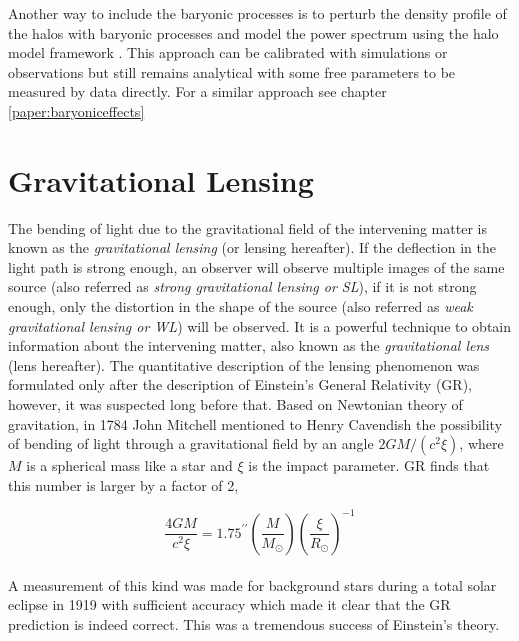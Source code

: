 Another way to include the baryonic processes is to perturb the density profile 
of the halos with baryonic processes and model the power spectrum using the halo model framework 
\cite{2014arXiv1410.6826M}.  This approach can 
be calibrated with simulations or observations but still remains analytical with some 
free parameters to be measured by data directly. 
For a similar approach see chapter \ref{paper:baryoniceffects}



\clearpage
\section{Gravitational Lensing}
The bending of light due to the gravitational field of the intervening matter is known as
the {\it gravitational lensing} (or lensing hereafter). If the deflection in the light
path is strong enough, an observer will observe multiple images of the same source 
(also referred as {\it strong gravitational lensing or SL}), 
if it is not strong enough, only the distortion in the shape of the source  
(also referred as {\it weak gravitational lensing or WL}) will be observed. It is a powerful technique to 
obtain information about the intervening matter, also known as the {\it gravitational
lens} (lens hereafter). The quantitative description of the lensing phenomenon
was formulated only after the description of Einstein's General Relativity (GR), however,
it was suspected long before that. Based on Newtonian theory of gravitation, in 1784 
John Mitchell mentioned to Henry Cavendish the possibility of bending of light
through a gravitational field by an angle $ 2GM/(c^2 \xi)$, where $M$ is a spherical
mass like a star and $\xi$ is the impact parameter. GR finds that this number is larger 
by a factor of 2,

\begin{equation}
	\dfrac{4GM}{c^2 \xi} = 1.75^{\prime \prime} 
					\left(\dfrac{M}{M_{\odot}}\right)
					\left(\dfrac{\xi}{R_{\odot}} \right)^{-1}
\end{equation}
\\
A measurement of this kind was made for background stars during a total solar eclipse
in 1919 with sufficient accuracy which made it clear that the GR prediction is indeed
correct. This was a tremendous success of Einstein's theory. 

